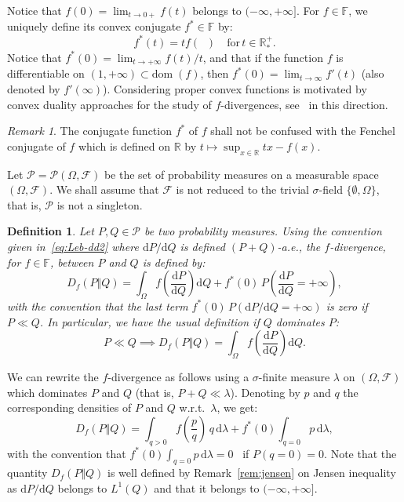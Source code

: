 \documentclass[12pt]{article}
\newcommand{\cf}{{\mathcal F}}
\newcommand{\cp}{{\mathcal P}}
\newcommand{\F}{{\mathbb F}}
\newcommand{\R}{{\mathbb R}}
\newcommand{\dom}{{\mathrm{dom}}\;}
\newcommand{\inv}[1]{\mathop{\frac{1}{#1}}\nolimits}
\newcommand{\rd}{\mathrm{d}}
\theoremstyle{plain}
\newtheorem{defi}{Definition}
\theoremstyle{remark}
\newtheorem{rem}{Remark}
\begin{document}
Notice that $f(0)=\lim_{t \rightarrow 0+}  f(t)$ belongs to $(-\infty, + \infty]$.
For $f\in \F$, we uniquely define its  convex conjugate $f^*\in \F$ by:
\begin{equation}
\label{eq:def_convex_conjugate}
    f^*(t) = t f\left(\inv{t}\right)
\quad\text{for}\, t\in \R_*^+.
\end{equation}
Notice that  $f^*(0)= \lim_{t  \to +\infty}  f(t)/t $,  and that  if the
function    $f$    is   differentiable    on    $(1,    +\infty   )\subset
\dom (f)$,    then
$f^*(0)= \lim_{t  \to \infty}  f'(t)$ (also  denoted by  $ f'(\infty)$).
Considering  proper  convex  functions  is motivated  by  convex  duality
approaches  for the study of $f$-divergences, see~\cite{agrawal2021optimal}  in  this
direction.




\begin{rem}
    The conjugate function $f^*$ of $f$ shall not be confused with  the
    Fenchel conjugate of $f$ which is defined on $\R$ by $t\mapsto  \sup_{x \in \R } tx - f(x)$.
\end{rem}
Let  $\cp=\cp(\Omega, \cf)$  be the  set  of probability  measures on  a
measurable space $(\Omega, \cf)$. We shall assume that
 $\cf$ is  not
      reduced  to the  trivial  $\sigma$-field $\{\emptyset,  \Omega\}$,
      that is, $\cp$ is not a singleton.

\begin{defi}
Let  $P, Q\in \cp$ be two probability
measures.
Using the convention given in~\eqref{eq:Leb-dd2} where $\rd P/\rd Q$ is
defined $(P+Q)$-a.e.,  the $f$-divergence,
for $f\in \F$,  between
$P$ and $Q$ is defined by:
\begin{equation}
\label{eq:definition_df0}
 D_f(P \Vert Q) = \int_\Omega f\left( \frac{\rd P}{\rd Q} \right) \rd
 Q + f^*(0) \, P \left( \frac{\rd P}{\rd Q} =+\infty \right),
 \end{equation}
 with the convention that the last term $f^*(0) \, P \left( {\rd P}/{\rd Q}
   =+\infty \right)$ is zero   if $P\ll Q$. In particular, we have the usual definition if $Q$ dominates $P$:
 \[
   P\ll Q \implies D_f(P \Vert Q) = \int_\Omega f\left( \frac{\rd P}{\rd Q} \right) \rd
   Q .
 \]
\end{defi}
We can rewrite the  $f$-divergence as follows using  a $\sigma$-finite
measure $\lambda$ on $(\Omega, \cf)$ which dominates  $P$ and $Q$ (that
is, $P+Q \ll \lambda$). Denoting  by $p$ and $q$ the corresponding
densities of $P$ and  $Q$ w.r.t.\ $\lambda$, we get:
\begin{equation}
\label{eq:definition_df}
D_f(P\Vert Q) = \int_{q>0} f\left(\frac{p}{q}\right)\, q \, \rd \lambda+f^*(0)\int_{q=0}  p \, \rd \lambda ,
\end{equation}
with the convention that $f^*(0)\int_{q=0}  p \, \rd \lambda=0$ \ if $P(q=0)=0$.
Note that the quantity $D_f(P\Vert Q)$ is well defined by
Remark~\ref{rem:jensen} on Jensen inequality as ${\rd P}/{\rd Q}$ belongs to $L^1(Q)$ and
that it belongs to $(-\infty , +\infty ]$.
\end{document}
